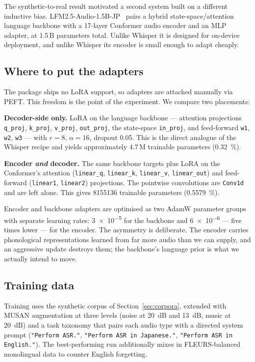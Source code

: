 \documentclass[11pt,a4paper]{article}
\begin{document}
The synthetic-to-real result motivated a second system built on a different
inductive bias. LFM2.5-Audio-1.5B-JP~\cite{liquidai2025lfm2audio} pairs a hybrid
state-space/attention language backbone with a 17-layer Conformer audio encoder
and an MLP adapter, at 1.5\,B parameters total. Unlike Whisper it
is designed for on-device deployment, and unlike Whisper its encoder is small
enough to adapt cheaply.

\subsection{Where to put the adapters}

The package ships no LoRA support, so adapters are attached manually via PEFT.
This freedom is the point of the experiment. We compare two placements:

\textbf{Decoder-side only.} LoRA on the language backbone --- attention
projections \texttt{q\_proj}, \texttt{k\_proj}, \texttt{v\_proj},
\texttt{out\_proj}, the state-space \texttt{in\_proj}, and feed-forward
\texttt{w1}, \texttt{w2}, \texttt{w3} --- with $r=8$, $\alpha=16$, dropout
\num{0.05}. This is the direct analogue of the Whisper recipe and yields
approximately 4.7\,M trainable parameters
(\SI{0.32}{\percent}).

\textbf{Encoder \emph{and} decoder.} The same backbone targets plus LoRA on the
Conformer's attention (\texttt{linear\_q}, \texttt{linear\_k}, \texttt{linear\_v},
\texttt{linear\_out}) and feed-forward (\texttt{linear1}, \texttt{linear2})
projections. The pointwise convolutions are \texttt{Conv1d} and are left alone.
This gives \num{8155136} trainable parameters (\SI{0.5579}{\percent}).

Encoder and backbone adapters are optimised as two AdamW parameter groups with
separate learning rates: \num{3e-5} for the backbone and \num{6e-6} --- five times
lower --- for the encoder. The asymmetry is deliberate. The encoder carries
phonological representations learned from far more audio than we can supply, and
an aggressive update destroys them; the backbone's language prior is what we
actually intend to move.

\subsection{Training data}

Training uses the synthetic corpus of Section~\ref{sec:corpora}, extended with
MUSAN augmentation at three levels (noise at \SI{20}{\deci\bel} and
\SI{13}{\deci\bel}, music at \SI{20}{\deci\bel}) and a task taxonomy that pairs
each audio type with a directed system prompt (\texttt{"Perform ASR."},
\texttt{"Perform ASR in Japanese."}, \texttt{"Perform ASR in English."}). The
best-performing run additionally mixes in FLEURS-balanced monolingual data to
counter English forgetting.
\end{document}
